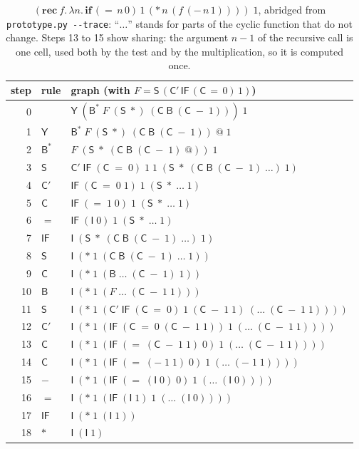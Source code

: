 \documentclass[11pt,a4paper]{article}
\newcommand{\cmb}[1]{\textsf{#1}}
\newcommand{\I}{\cmb{I}}
\newcommand{\Sc}{\cmb{S}}
\newcommand{\B}{\cmb{B}}
\newcommand{\C}{\cmb{C}}
\newcommand{\Bs}{\cmb{B}^{*}}
\newcommand{\Cp}{\cmb{C}'}
\newcommand{\Y}{\cmb{Y}}
\newcommand{\IF}{\cmb{IF}}
\theoremstyle{definition}
\theoremstyle{plain}
\begin{document}
\begin{table}[t]
\centering
\footnotesize
\setlength{\tabcolsep}{4pt}
\begin{tabular}{@{}r l l@{}}
\toprule
step & rule & graph (with $F = \Sc\,(\Cp\,\IF\,(\C\,{=}\,0)\,1)$)\\
\midrule
0 & & $\Y\;(\Bs\;F\;(\Sc\;{*})\;(\C\;\B\;(\C\;{-}\;1)))\;1$\\
1 & $\Y$ & $\Bs\;F\;(\Sc\;{*})\;(\C\;\B\;(\C\;{-}\;1))\;@\;1$\\
2 & $\Bs$ & $F\;(\Sc\;{*}\;(\C\;\B\;(\C\;{-}\;1)\;@))\;1$\\
3 & $\Sc$ & $\Cp\;\IF\;(\C\;{=}\;0)\;1\;1\;(\Sc\;{*}\;(\C\;\B\;(\C\;{-}\;1)\;\ldots)\;1)$\\
4 & $\Cp$ & $\IF\;(\C\;{=}\;0\;1)\;1\;(\Sc\;{*}\;\ldots\;1)$\\
5 & $\C$ & $\IF\;({=}\;1\;0)\;1\;(\Sc\;{*}\;\ldots\;1)$\\
6 & ${=}$ & $\IF\;(\I\;0)\;1\;(\Sc\;{*}\;\ldots\;1)$\\
7 & $\IF$ & $\I\;(\Sc\;{*}\;(\C\;\B\;(\C\;{-}\;1)\;\ldots)\;1)$\\
8 & $\Sc$ & $\I\;({*}\;1\;(\C\;\B\;(\C\;{-}\;1)\;\ldots\;1))$\\
9 & $\C$ & $\I\;({*}\;1\;(\B\;\ldots\;(\C\;{-}\;1)\;1))$\\
10 & $\B$ & $\I\;({*}\;1\;(F\;\ldots\;(\C\;{-}\;1\;1)))$\\
11 & $\Sc$ & $\I\;({*}\;1\;(\Cp\;\IF\;(\C\;{=}\;0)\;1\;(\C\;{-}\;1\;1)\;(\ldots\;(\C\;{-}\;1\;1))))$\\
12 & $\Cp$ & $\I\;({*}\;1\;(\IF\;(\C\;{=}\;0\;(\C\;{-}\;1\;1))\;1\;(\ldots\;(\C\;{-}\;1\;1))))$\\
13 & $\C$ & $\I\;({*}\;1\;(\IF\;({=}\;(\C\;{-}\;1\;1)\;0)\;1\;(\ldots\;(\C\;{-}\;1\;1))))$\\
14 & $\C$ & $\I\;({*}\;1\;(\IF\;({=}\;({-}\;1\;1)\;0)\;1\;(\ldots\;({-}\;1\;1))))$\\
15 & ${-}$ & $\I\;({*}\;1\;(\IF\;({=}\;(\I\;0)\;0)\;1\;(\ldots\;(\I\;0))))$\\
16 & ${=}$ & $\I\;({*}\;1\;(\IF\;(\I\;1)\;1\;(\ldots\;(\I\;0))))$\\
17 & $\IF$ & $\I\;({*}\;1\;(\I\;1))$\\
18 & ${*}$ & $\I\;(\I\;1)$\\
\bottomrule
\end{tabular}
\caption{$(\mathbf{rec}\ f.\,\lambda n.\,\mathbf{if}\,({=}\,n\,0)\,1\,({*}\,n\,(f\,({-}\,n\,1))))\;1$,
abridged from \texttt{prototype.py -{}-trace}: ``$\ldots$'' stands for parts of
the cyclic function that do not change. Steps 13 to 15 show sharing: the
argument $n-1$ of the recursive call is one cell, used both by the test and
by the multiplication, so it is computed once.}
\label{tab:fac}
\end{table}
\end{document}
